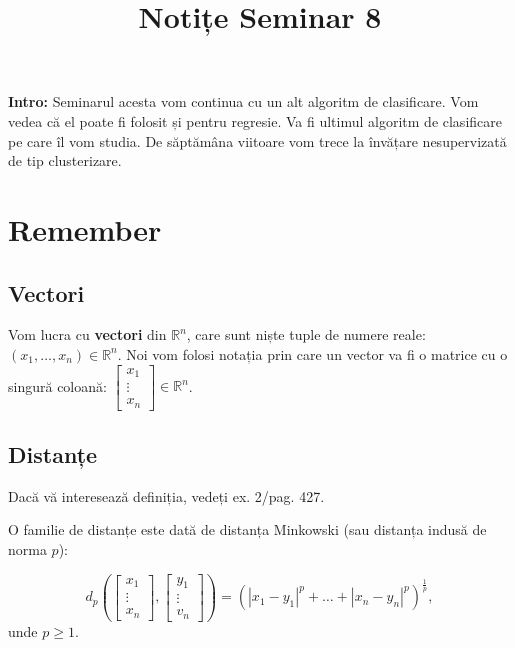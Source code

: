 \documentclass[12pt]{article}
\title{%
	\textbf{Notițe Seminar 8}}
\begin{document}
	
	\maketitle
	
	\textbf{{Intro:}} Seminarul acesta vom continua cu un alt algoritm de clasificare. Vom vedea că el poate fi folosit și pentru regresie. Va fi ultimul algoritm de clasificare pe care îl vom studia. De săptămâna viitoare vom trece la învățare nesupervizată de tip clusterizare.

	\section{Remember}
	\subsection{Vectori}
	
	Vom lucra cu \textbf{vectori} din $\mathbb{R}^n$, care sunt niște tuple de numere reale: $(x_1,\dots,x_n) \in \mathbb{R}^n$. Noi vom folosi notația prin care un vector va fi o matrice cu o singură coloană: $\begin{bmatrix}
	x_1\\
	\vdots\\
	x_n
	\end{bmatrix} \in \mathbb{R}^n$.

	\subsection{Distanțe}
	
	Dacă vă interesează definiția, vedeți ex. 2/pag. 427.
	
	O familie de distanțe este dată de distanța Minkowski (sau distanța indusă de norma $p$):
	
	$$d_p\left( \begin{bmatrix}
	x_1\\
	\vdots\\
	x_n
	\end{bmatrix}, \begin{bmatrix}
	y_1\\
	\vdots\\
	v_n
	\end{bmatrix} \right) = \left( |x_1 - y_1|^p + \dots + |x_n - y_n|^p \right)^\frac{1}{p},$$
	unde $p \geq 1$.
	
\end{document}
